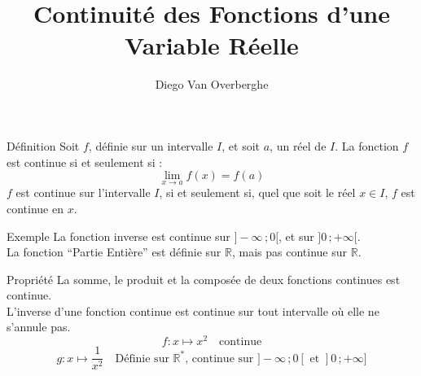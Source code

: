 \documentclass{cours}
\title{Continuité des Fonctions d'une \\ Variable Réelle}
\author{Diego Van Overberghe}
\begin{document}

    \begin{Gpartie}{Définition}
        Soit $f$, définie sur un intervalle $I$, et soit $a$, un réel de $I$.
        La fonction $f$ est continue si et seulement si : \[\lim_{x \to a} f(x)=f(a)\]
        $f$ est continue sur l'intervalle $I$, si et seulement si, quel que soit le réel $x\in I$, $f$ est continue en $x$.

        \begin{Spartie}{Exemple}
            La fonction inverse est continue sur $]-\infty\,;0[$, et sur $]0\,;+\infty[$.\\
            La fonction ``Partie Entière'' est définie sur $\mathbb{R}$, mais pas continue sur $\mathbb{R}$. \\[2ex]
            \begin{center}\end{center}
            \parbox{\linewidth}{\captionof{figure}{\centering Représentation Graphique de la Fonction \linebreak ``Partie Entière'', continue sur $[n\,;n+1[$ avec $n\in\mathbb{Z}$.}}
            \begin{center}\end{center}
            \parbox{\linewidth}{}
        \end{Spartie}

        \begin{Spartie}{Propriété}
            La somme, le produit et la composée de deux fonctions continues est continue. \\
            L'inverse d'une fonction continue est continue sur tout intervalle où elle ne s'annule pas.
            \[f : x\mapsto x^2\quad\text{continue}\] \[g : x\mapsto\dfrac{1}{x^2}\quad\text{Définie sur }\mathbb{R}^*\text{, continue sur }]-\infty\,;0[\text{ et }]0\,;+\infty]\]
        \end{Spartie}
    \end{Gpartie}
\end{document}
